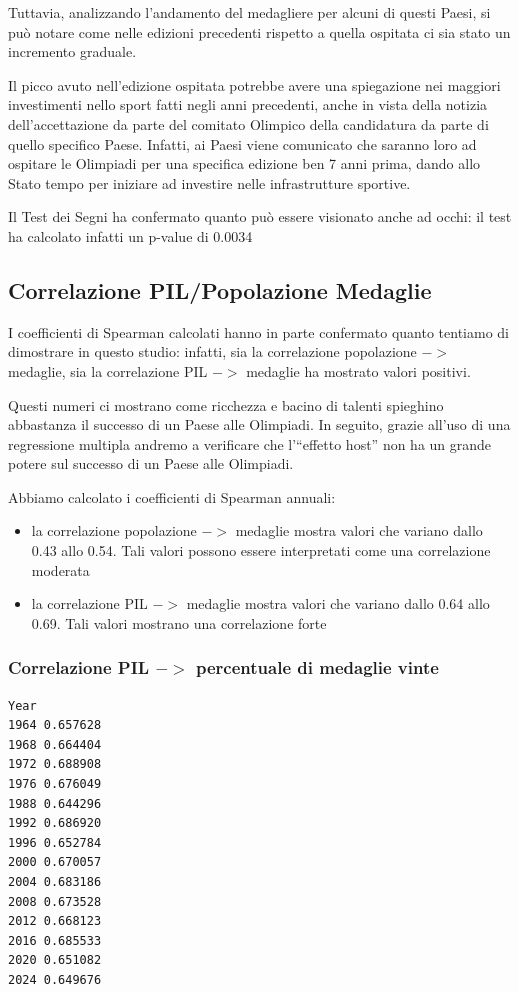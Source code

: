 Tuttavia, analizzando l’andamento del medagliere per alcuni di questi Paesi, si può notare come nelle edizioni precedenti rispetto a quella ospitata ci sia stato un incremento graduale.

Il picco avuto nell’edizione ospitata potrebbe avere una spiegazione nei maggiori investimenti nello sport fatti negli anni precedenti, anche in vista della notizia dell’accettazione da parte del comitato Olimpico della candidatura da parte di quello specifico Paese. Infatti, ai Paesi viene comunicato che saranno loro ad ospitare le Olimpiadi per una specifica edizione ben 7 anni prima, dando allo Stato tempo per iniziare ad investire nelle infrastrutture sportive.

Il Test dei Segni ha confermato quanto può essere visionato anche ad occhi: il test ha calcolato infatti un p-value di 0.0034

\subsection*{Correlazione PIL/Popolazione Medaglie}
I coefficienti di Spearman calcolati hanno in parte confermato quanto tentiamo di dimostrare in questo studio: infatti, sia la correlazione popolazione $->$ medaglie, sia la correlazione PIL $->$ medaglie ha mostrato valori positivi.

Questi numeri ci mostrano come ricchezza e bacino di talenti spieghino abbastanza il successo di un Paese alle Olimpiadi. In seguito, grazie all’uso di una regressione multipla andremo a verificare che l'``effetto host'' non ha un grande potere sul successo di un Paese alle Olimpiadi.

Abbiamo calcolato i coefficienti di Spearman annuali:
\begin{itemize}
    \item la correlazione popolazione $->$ medaglie mostra valori che variano dallo 0.43 allo 0.54. Tali valori possono essere interpretati come una correlazione moderata
    \item la correlazione PIL $->$ medaglie mostra valori che variano dallo 0.64 allo 0.69. Tali valori mostrano una correlazione forte
\end{itemize}

\subsubsection*{Correlazione PIL $->$ percentuale di medaglie vinte}
\begin{verbatim}
Year
1964 0.657628
1968 0.664404
1972 0.688908
1976 0.676049
1988 0.644296
1992 0.686920
1996 0.652784
2000 0.670057
2004 0.683186
2008 0.673528
2012 0.668123
2016 0.685533
2020 0.651082
2024 0.649676
\end{verbatim}

